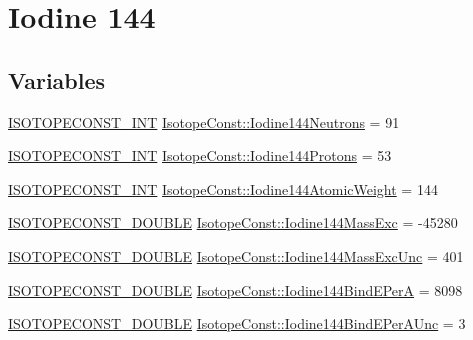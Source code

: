 \hypertarget{group___isotope_const-_iodine-_i144}{}\section{Iodine 144}
\label{group___isotope_const-_iodine-_i144}
\subsection*{Variables}
\begin{DoxyCompactItemize}
\item 
\mbox{\hyperlink{group___isotope_const-_macros_ga5f18360b3e99483a35c32d789e62621c}{I\+S\+O\+T\+O\+P\+E\+C\+O\+N\+S\+T\+\_\+\+I\+NT}} \mbox{\hyperlink{group___isotope_const-_iodine-_i144_ga9d984323d02a2397a83384ae2fe2944f}{Isotope\+Const\+::\+Iodine144\+Neutrons}} = 91
\item 
\mbox{\hyperlink{group___isotope_const-_macros_ga5f18360b3e99483a35c32d789e62621c}{I\+S\+O\+T\+O\+P\+E\+C\+O\+N\+S\+T\+\_\+\+I\+NT}} \mbox{\hyperlink{group___isotope_const-_iodine-_i144_ga37a419213348c56ba062dc7bc27163cb}{Isotope\+Const\+::\+Iodine144\+Protons}} = 53
\item 
\mbox{\hyperlink{group___isotope_const-_macros_ga5f18360b3e99483a35c32d789e62621c}{I\+S\+O\+T\+O\+P\+E\+C\+O\+N\+S\+T\+\_\+\+I\+NT}} \mbox{\hyperlink{group___isotope_const-_iodine-_i144_gad79a14e4d25ccae5fd64cf34ff1af16d}{Isotope\+Const\+::\+Iodine144\+Atomic\+Weight}} = 144
\item 
\mbox{\hyperlink{group___isotope_const-_macros_ga8f45a7272ce02c0b4c65c44636ed719a}{I\+S\+O\+T\+O\+P\+E\+C\+O\+N\+S\+T\+\_\+\+D\+O\+U\+B\+LE}} \mbox{\hyperlink{group___isotope_const-_iodine-_i144_gab5572a02161ad5b77da5f9b8f18fb914}{Isotope\+Const\+::\+Iodine144\+Mass\+Exc}} = -\/45280
\item 
\mbox{\hyperlink{group___isotope_const-_macros_ga8f45a7272ce02c0b4c65c44636ed719a}{I\+S\+O\+T\+O\+P\+E\+C\+O\+N\+S\+T\+\_\+\+D\+O\+U\+B\+LE}} \mbox{\hyperlink{group___isotope_const-_iodine-_i144_ga18148abbd122427c136286b1dd7cc2ec}{Isotope\+Const\+::\+Iodine144\+Mass\+Exc\+Unc}} = 401
\item 
\mbox{\hyperlink{group___isotope_const-_macros_ga8f45a7272ce02c0b4c65c44636ed719a}{I\+S\+O\+T\+O\+P\+E\+C\+O\+N\+S\+T\+\_\+\+D\+O\+U\+B\+LE}} \mbox{\hyperlink{group___isotope_const-_iodine-_i144_ga9457c7d887603a66c2d61d4ebcfe8353}{Isotope\+Const\+::\+Iodine144\+Bind\+E\+PerA}} = 8098
\item 
\mbox{\hyperlink{group___isotope_const-_macros_ga8f45a7272ce02c0b4c65c44636ed719a}{I\+S\+O\+T\+O\+P\+E\+C\+O\+N\+S\+T\+\_\+\+D\+O\+U\+B\+LE}} \mbox{\hyperlink{group___isotope_const-_iodine-_i144_gab04257e099b898e45a70b4eaa06e7b80}{Isotope\+Const\+::\+Iodine144\+Bind\+E\+Per\+A\+Unc}} = 3

\end{DoxyCompactItemize}
